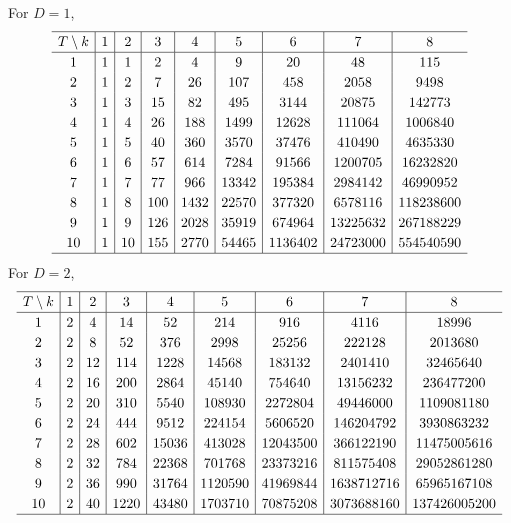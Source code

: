 \documentclass[pdftex]{sigma}
\numberwithin{equation}{section}
\begin{document}
For $D=1$,
\begin{gather*}
\setlength{\tabcolsep}{4.5pt}
\renewcommand{\arraystretch}{1.2}
\begin{tabular}{c|c|c|c|c|c|c|c|c}
\hline $T\setminus k$&1&2&3&4&5&6&7&8\\ \hline
1& 1& 1& 2& 4& 9& 20& 48& 115\\
2&1& 2& 7& 26& 107& 458& 2058& 9498\\
3&1& 3& 15& 82& 495& 3144& 20875& 142773\\
4&1& 4& 26& 188& 1499& 12628& 111064& 1006840\\
5&1& 5& 40& 360& 3570& 37476& 410490& 4635330\\
6&1& 6& 57& 614& 7284& 91566& 1200705& 16232820\\
7&1& 7& 77& 966& 13342& 195384& 2984142& 46990952\\
8&1& 8& 100& 1432& 22570& 377320& 6578116& 118238600\\
9&1& 9& 126& 2028& 35919& 674964& 13225632& 267188229\\
10&1& 10& 155& 2770& 54465& 1136402& 24723000& 554540590\\
\hline
\end{tabular}
\end{gather*}
For $D=2$,
\begin{gather*}
\setlength{\tabcolsep}{4.5pt}
\renewcommand{\arraystretch}{1.2}
\begin{tabular}{c|c|c|c|c|c|c|c|c}
\hline $T\setminus k$&1&2&3&4&5&6&7&8\\ \hline
1&2& 4& 14& 52& 214& 916& 4116& 18996\\
2&2& 8& 52& 376& 2998& 25256& 222128& 2013680\\
3&2& 12& 114& 1228& 14568& 183132& 2401410& 32465640\\
4&2& 16& 200& 2864& 45140& 754640& 13156232& 236477200\\
5&2& 20& 310& 5540& 108930& 2272804& 49446000& 1109081180\\
6&2& 24& 444& 9512& 224154& 5606520& 146204792& 3930863232\\
7&2& 28& 602& 15036& 413028& 12043500& 366122190& 11475005616\\
8&2& 32& 784& 22368& 701768& 23373216& 811575408& 29052861280\\
9&2& 36& 990& 31764& 1120590& 41969844& 1638712716& 65965167108\\
10&2& 40& 1220& 43480& 1703710& 70875208& 3073688160& 137426005200\\
\hline
\end{tabular}
\end{gather*}
\end{document}
